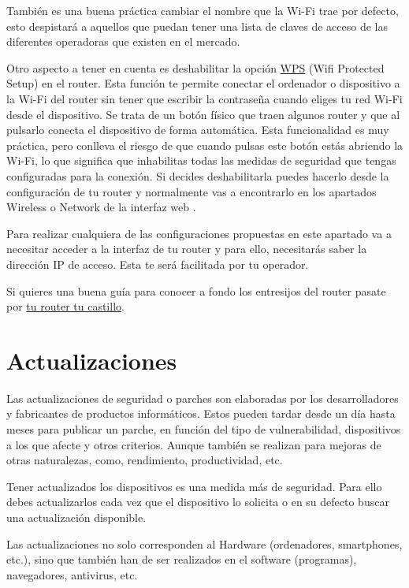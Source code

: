 \documentclass[
  spanish,
  a4paper,
  openany]{book}
\begin{document}
También es una buena práctica cambiar el nombre que la Wi-Fi trae por defecto, esto despistará a aquellos que puedan tener una lista de claves de acceso de las diferentes operadoras que existen en el mercado.

Otro aspecto a tener en cuenta es deshabilitar la opción \href{https://es.wikipedia.org/wiki/Wi-Fi_Protected_Setup}{WPS} (Wifi Protected Setup) en el router. Esta función te permite conectar el ordenador o dispositivo a la Wi-Fi del router sin tener que escribir la contraseña cuando eliges tu red Wi-Fi desde el dispositivo. Se trata de un botón físico que traen algunos router y que al pulsarlo conecta el dispositivo de forma automática. Esta funcionalidad es muy práctica, pero conlleva el riesgo de que cuando pulsas este botón estás abriendo la Wi-Fi, lo que significa que inhabilitas todas las medidas de seguridad que tengas configuradas para la conexión. Si decides deshabilitarla puedes hacerlo desde la configuración de tu router y normalmente vas a encontrarlo en los apartados Wireless o Network de la interfaz web \citep{XATAKA-wps}.

Para realizar cualquiera de las configuraciones propuestas en este apartado va a necesitar acceder a la interfaz de tu router y para ello, necesitarás saber la dirección IP de acceso. Esta te será facilitada por tu operador.

Si quieres una buena guía para conocer a fondo los entresijos del router pasate por \href{https://www.osi.es/sites/default/files/docs/guia_router/osi-guia-tu-router-tu-castillo.pdf}{tu router tu castillo}.

\hypertarget{actualizaciones}{%
\section{Actualizaciones}\label{actualizaciones}}

Las actualizaciones de seguridad o parches son elaboradas por los desarrolladores y fabricantes de productos informáticos. Estos pueden tardar desde un día hasta meses para publicar un parche, en función del tipo de vulnerabilidad, dispositivos a los que afecte y otros criterios. Aunque también se realizan para mejoras de otras naturalezas, como, rendimiento, productividad, etc.

Tener actualizados los dispositivos es una medida más de seguridad. Para ello debes actualizarlos cada vez que el dispositivo lo solicita o en su defecto buscar una actualización disponible.

Las actualizaciones no solo corresponden al Hardware (ordenadores, smartphones, etc.), sino que también han de ser realizados en el software (programas), navegadores, antivirus, etc.
\end{document}
